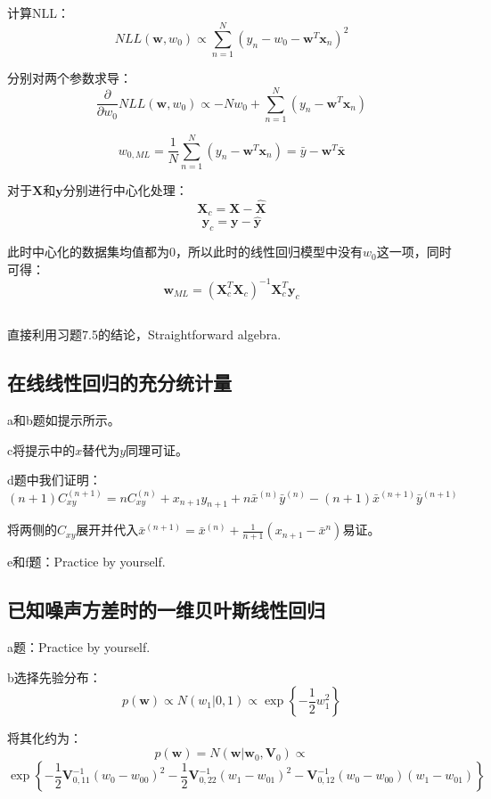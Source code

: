 \documentclass[UTF8]{ctexart}
\begin{document}
\subsection{}
计算NLL：
$$NLL(\textbf{w},w_{0})\propto \sum_{n=1}^{N}(y_{n}-w_{0}-\textbf{w}^{T}\textbf{x}_{n})^{2}$$

分别对两个参数求导：
$$\frac{\partial}{\partial w_{0}}NLL(\textbf{w},w_{0}) \propto -Nw_{0} +\sum_{n=1}^{N}(y_{n}-\textbf{w}^{T}\textbf{x}_{n})$$

$$w_{0,ML}=\frac{1}{N} \sum_{n=1}^{N}(y_{n}-\textbf{w}^{T}\textbf{x}_{n})=\bar{y}-\textbf{w}^{T}\bar{\textbf{x}}$$

对于$\textbf{X}$和$\textbf{y}$分别进行中心化处理：
$$\textbf{X}_{c}=\textbf{X}-\hat{\textbf{X}}$$
$$\textbf{y}_{c}=\textbf{y}-\hat{\textbf{y}}$$

此时中心化的数据集均值都为0，所以此时的线性回归模型中没有$w_{0}$这一项，同时可得：
$$\textbf{w}_{ML}=(\textbf{X}_{c}^{T}\textbf{X}_{c})^{-1}\textbf{X}_{c}^{T}\textbf{y}_{c}$$

\subsection{}
直接利用习题7.5的结论，Straightforward algebra.

\subsection{在线线性回归的充分统计量}
a和b题如提示所示。

c将提示中的$x$替代为$y$同理可证。

d题中我们证明：
$$(n+1)C_{xy}^{(n+1)}=nC_{xy}^{(n)}+x_{n+1}y_{n+1}+n\bar{x}^{(n)}\bar{y}^{(n)}-(n+1)\bar{x}^{(n+1)}\bar{y}^{(n+1)}$$

将两侧的$C_{xy}$展开并代入$\bar{x}^{(n+1)}=\bar{x}^{(n)}+\frac{1}{n+1}(x_{n+1}-\bar{x}^{n})$易证。

e和f题：Practice by yourself.

\subsection{已知噪声方差时的一维贝叶斯线性回归}
a题：Practice by yourself.

b选择先验分布：
$$p(\textbf{w}) \propto N(w_{1}|0,1) \propto \exp\left\{ -\frac{1}{2}w_{1}^{2} \right\}$$

将其化约为：
$$p(\textbf{w})=N(\textbf{w}|\textbf{w}_{0},\textbf{V}_{0}) \propto $$
$$\exp\left\{ -\frac{1}{2}\textbf{V}_{0,11}^{-1}(w_{0}-w_{00})^{2} - \frac{1}{2}\textbf{V}^{-1}_{0,22}(w_{1}-w_{01})^{2} -\textbf{V}^{-1}_{0,12}(w_{0}-w_{00})(w_{1}-w_{01})\right\}$$
\end{document}
